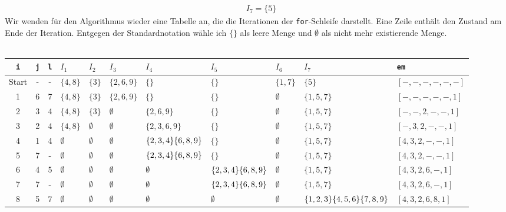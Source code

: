 \documentclass[a4paper,10pt]{article}
\begin{document}
\begin{enumerate}
\begin{align*}
	&I_7 = \{5\}
	\end{align*}
	Wir wenden für den Algorithmus wieder eine Tabelle an, die die Iterationen der \texttt{for}-Schleife darstellt. Eine Zeile enthält den Zustand am Ende der Iteration. Entgegen der Standardnotation wähle ich $\{\}$ als leere Menge und $\emptyset$ als nicht mehr existierende Menge.\\ \\
	\begin{tabular}{ c || c | c | l | l | l | p{1.5cm} | p{1.2cm} | l | p{1.2cm} || l }
	\texttt{i} & \texttt{j} & \texttt{l} & \textbf{$I_1$} & \textbf{$I_2$} & \textbf{$I_3$} & \textbf{$I_4$} & \textbf{$I_5$} & \textbf{$I_6$} & \textbf{$I_7$} & \texttt{em}\\
	\hline
	Start & - & - & $\{4, 8\}$ & $\{3\}$ & $\{2, 6, 9\}$ & $\{\}$ & $\{\}$ & $\{1, 7\}$ & $\{5\}$ & $[-, -, -, -, -, -]$ \\
	\hline
	1 & 6 & 7 & $\{4, 8\}$ & $\{3\}$ & $\{2, 6, 9\}$ & $\{\}$ & $\{\}$ & $\emptyset$ & $\{1, 5, 7\}$ & $[-, -, -, -, -, 1]$ \\
	\hline
	2 & 3 & 4 & $\{4, 8\}$ & $\{3\}$ & $\emptyset$ & $\{2, 6, 9\}$ & $\{\}$ & $\emptyset$ & $\{1, 5, 7\}$ & $[-, -, 2, -, -, 1]$ \\
	\hline
	3 & 2 & 4 & $\{4, 8\}$ & $\emptyset$ & $\emptyset$ & $\{2, 3, 6, 9\}$ & $\{\}$ & $\emptyset$ & $\{1, 5, 7\}$ & $[-, 3, 2, -, -, 1]$ \\
	\hline
	4 & 1 & 4 & $\emptyset$ & $\emptyset$ & $\emptyset$ & $\{2, 3, 4\} \newline\{6, 8, 9\}$ & $\{\}$ & $\emptyset$ & $\{1, 5, 7\}$ & $[4, 3, 2, -, -, 1]$ \\
	\hline
	5 & 7 & - & $\emptyset$ & $\emptyset$ & $\emptyset$ & $\{2, 3, 4\} \newline\{6, 8, 9\}$ & $\{\}$ & $\emptyset$ & $\{1, 5, 7\}$ & $[4, 3, 2, -, -, 1]$ \\
	\hline
	6 & 4 & 5 & $\emptyset$ & $\emptyset$ & $\emptyset$ & $\emptyset$ & $\{2, 3, 4\} \newline\{6, 8, 9\}$ & $\emptyset$ & $\{1, 5, 7\}$ & $[4, 3, 2, 6, -, 1]$ \\
	\hline
	7 & 7 & - & $\emptyset$ & $\emptyset$ & $\emptyset$ & $\emptyset$ & $\{2, 3, 4\} \newline\{6, 8, 9\}$ & $\emptyset$ & $\{1, 5, 7\}$ & $[4, 3, 2, 6, -, 1]$ \\
	\hline
	8 & 5 & 7 & $\emptyset$ & $\emptyset$ & $\emptyset$ & $\emptyset$ & $\emptyset$ & $\emptyset$ & $\{1, 2, 3\} \newline \{4, 5, 6\} \newline \{7, 8, 9\}$ & $[4, 3, 2, 6, 8, 1]$ \\

\end{tabular}
\end{enumerate}
\end{document}
